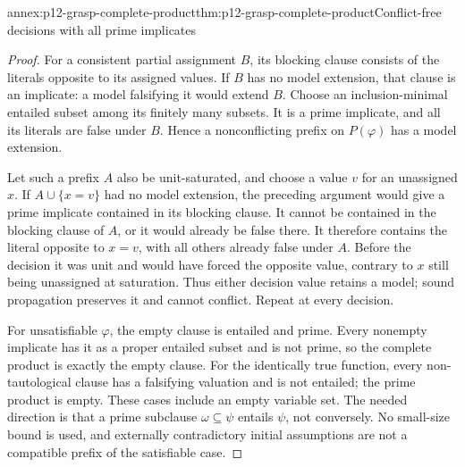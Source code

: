 \begin{annexitem}{annex:p12-grasp-complete-product}{thm:p12-grasp-complete-product}{Conflict-free decisions with all prime implicates}
\begin{proof}
For a consistent partial assignment \(B\), its blocking clause consists of
the literals opposite to its assigned values.  If \(B\) has no model
extension, that clause is an implicate: a model falsifying it would extend
\(B\).  Choose an inclusion-minimal entailed subset among its finitely many
subsets.  It is a prime implicate, and all its literals are false under
\(B\).  Hence a nonconflicting prefix on \(P(\varphi)\) has a model
extension.

Let such a prefix \(A\) also be unit-saturated, and choose a value \(v\)
for an unassigned \(x\).  If \(A\cup\{x=v\}\) had no model extension,
the preceding argument would give a prime implicate contained in its
blocking clause.  It cannot be contained in the blocking clause of \(A\),
or it would already be false there.  It therefore contains the literal
opposite to \(x=v\), with all others already false under \(A\).
Before the decision it was unit and would have forced the opposite value,
contrary to \(x\) still being unassigned at saturation.  Thus either
decision value retains a model; sound propagation preserves it and cannot
conflict.  Repeat at every decision.

For unsatisfiable \(\varphi\), the empty clause is entailed and prime.
Every nonempty implicate has it as a proper entailed subset and is not prime,
so the complete product is exactly the empty clause.  For the identically
true function, every non-tautological clause has a falsifying valuation and
is not entailed; the prime product is empty.  These cases include an empty
variable set.  The needed direction is that a prime subclause
\(\omega\subseteq\psi\) entails \(\psi\), not conversely.
No small-size bound is used, and externally contradictory initial assumptions
are not a compatible prefix of the satisfiable case.
\end{proof}
\end{annexitem}

